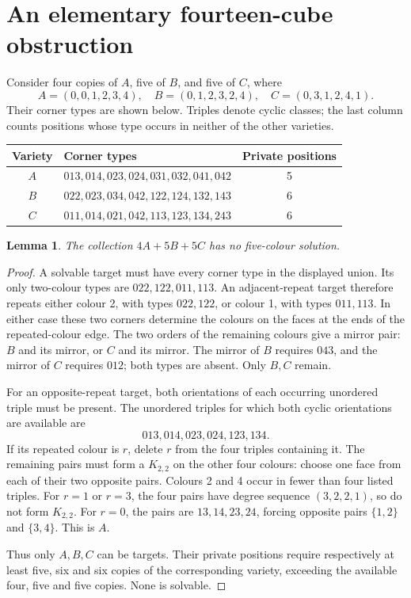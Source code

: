 \documentclass[11pt]{article}
\newtheorem{lemma}[theorem]{Lemma}
\theoremstyle{remark}
\begin{document}
\section{An elementary fourteen-cube obstruction}\label{sec:lower}
Consider four copies of $A$, five of $B$, and five of $C$, where
\[
 A=(0,0,1,2,3,4),\quad B=(0,1,2,3,2,4),\quad C=(0,3,1,2,4,1).
\]
Their corner types are shown below. Triples denote cyclic classes; the last
column counts positions whose type occurs in neither of the other varieties.
\begin{center}
\begin{tabular}{clc}
\toprule
Variety & Corner types & Private positions\\
\midrule
$A$ & $013,014,023,024,031,032,041,042$ & 5\\
$B$ & $022,023,034,042,122,124,132,143$ & 6\\
$C$ & $011,014,021,042,113,123,134,243$ & 6\\
\bottomrule
\end{tabular}
\end{center}
\begin{lemma}\label{lem:lower}
The collection $4A+5B+5C$ has no five-colour solution.
\end{lemma}
\begin{proof}
A solvable target must have every corner type in the displayed union.
Its only two-colour types are $022,122,011,113$. An adjacent-repeat target
therefore repeats either colour 2, with types $022,122$, or colour 1,
with types $011,113$. In either case these two corners determine the colours
on the faces at the ends of the repeated-colour edge. The two orders of the
remaining colours give a mirror pair: $B$ and its mirror, or $C$ and its
mirror. The mirror of $B$ requires $043$, and the mirror of $C$ requires
$012$; both types are absent. Only $B,C$ remain.

For an opposite-repeat target, both orientations of each occurring
unordered triple must be present. The unordered triples for which both cyclic orientations are available are
\[
  013,014,023,024,123,134.
\]
If its repeated colour is $r$, delete $r$ from the four triples containing
it. The remaining pairs must form a $K_{2,2}$ on the other four colours:
choose one face from each of their two opposite pairs. Colours 2 and 4
occur in fewer than four listed triples. For $r=1$ or $r=3$, the four pairs
have degree sequence $(3,2,2,1)$, so do not form $K_{2,2}$. For $r=0$, the
pairs are $13,14,23,24$, forcing opposite pairs $\{1,2\}$ and $\{3,4\}$.
This is $A$.

Thus only $A,B,C$ can be targets. Their private positions require respectively
at least five, six and six copies of the corresponding variety, exceeding
the available four, five and five copies. None is solvable.
\end{proof}
\end{document}

